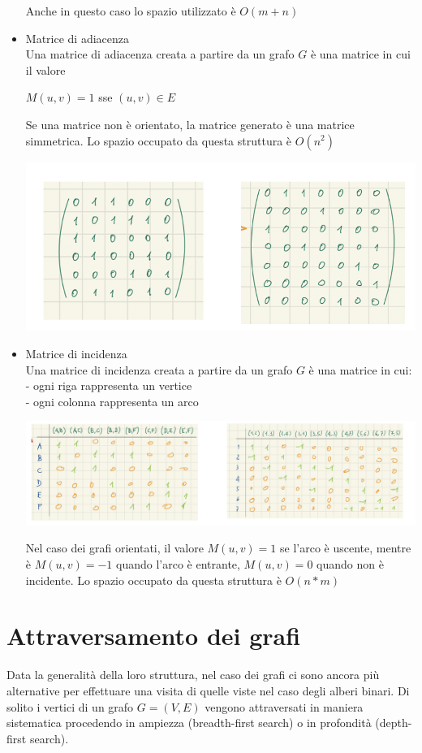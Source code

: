 \documentclass[11pt, oneside]{article}   	%
\begin{document}
\begin{itemize}
\begin{center}
\end{center}
Anche in questo caso lo spazio utilizzato è $O(m+n)$
\item Matrice di adiacenza\\
Una matrice di adiacenza creata a partire da un grafo $G$ è una matrice in cui il valore\begin{center}
$M(u,v) = 1$ sse $(u,v)\in E$
\end{center}
Se una matrice non è orientato, la matrice generato è una matrice simmetrica.
Lo spazio occupato da questa struttura è $O(n^2)$
\begin{center}
\includegraphics[scale=0.8]{b4}
\end{center}
\item Matrice di incidenza\\
Una matrice di incidenza creata a partire da un grafo $G$ è una matrice in cui:\\
- ogni riga rappresenta un vertice\\
- ogni colonna rappresenta un arco
\begin{center}
\includegraphics[scale=0.6]{b5}
\end{center}
Nel caso dei grafi orientati, il valore $M(u,v) = 1$ se l'arco è uscente, mentre è $M(u,v) = -1$ quando l'arco è entrante, $M(u,v) = 0$ quando non è incidente. Lo spazio occupato da questa struttura è $O(n*m)$
\end{itemize}

\section*{Attraversamento dei grafi}
Data la generalità della loro struttura, nel caso dei grafi ci sono ancora più alternative per effettuare una visita di quelle viste nel caso degli alberi binari. Di solito i vertici di un grafo $G = (V,E)$ vengono attraversati in maniera sistematica procedendo in ampiezza (breadth-first search) o in profondità (depth-first search).
\end{document}
